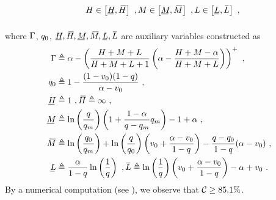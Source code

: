 \begin{lemma}
\begin{align}
\begin{array}{llll}
          \\
          \vspace{10pt}
          && H\in\left[\HUnderBar, \HOverBar\right]~, 
          M\in\left[\MUnderBar, \MOverBar\right]~,
          L\in\left[\LUnderBar, \LOverBar\right]~,& 
        \end{array}
    \end{align}
    where $\Gamma$, $q_0$, $\HUnderBar, \HOverBar, \MUnderBar, \MOverBar, \LUnderBar, \LOverBar$ are auxiliary variables constructed as 
    \begin{align*}
        \exanteutilratio &\triangleq  \displaystyle
        \revratio - \plus{\frac{H + M + L}{H + M + L + 1}\left(\revratio - \frac{H + M - \revratio}{H + M + L}\right)}~,
        \\
        \quant_0 &\triangleq 1 - \frac{(1 - \val_0)(1 - q)}{\revratio - \val_0}~,
        \\
        \HUnderBar &\triangleq 1~, \HOverBar \triangleq \infty~, 
        \\
        \MUnderBar &\triangleq \ln\left(\frac{q}{\optquant}\right)\left(1 + \frac{1 - \revratio}{q - \optquant}\optquant\right) - 1 + \revratio ~,
        \\
        \MOverBar &\triangleq  \ln\left(\frac{\quant_0}{\optquant}\right) 
        +
        \ln\left(\frac{q}{\quant_0}\right)\left(\val_0 + \frac{\revratio - \val_0}{1 - q}\right) 
        -
        \frac{q - \quant_0}{1 - q}(\revratio - \val_0)~,
        \\
        \LUnderBar &\triangleq \frac{\revratio}{1 - \quant}\ln\left(\frac{1}{\quant}\right)~,
        \LOverBar \triangleq \ln\left(\frac{1}{q}\right)\left(\val_0 + \frac{\revratio - \val_0}{1 - q}\right) - \revratio + \val_0~.
    \end{align*}
    By a numerical computation (see ), we observe that 
    $\mathcal{C}\geq {85.1\%}$.
\end{lemma}

